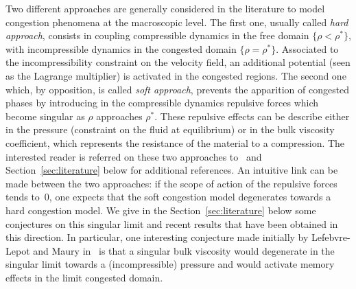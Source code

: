 \documentclass[10pt]{amsart}
\newcommand{\<}{\bigl\langle}
\renewcommand{\>}{\bigr\rangle}
\theoremstyle{definition}
\theoremstyle{remark}
\begin{document}
Two different approaches are generally considered in the literature to model congestion phenomena at the macroscopic level.
The first one, usually called \emph{hard approach}, consists in coupling compressible dynamics in the free domain $\{\rho < \rho^*\}$, with incompressible dynamics in the congested domain $\{\rho = \rho^*\}$.
Associated to the incompressibility constraint on the velocity field, an additional potential (seen as the Lagrange multiplier) is activated in the congested regions.
The second one which, by opposition, is called \emph{soft approach}, prevents the apparition of congested phases by introducing in the compressible dynamics repulsive forces which become singular as $\rho$ approaches $\rho^*$.
These repulsive effects can be describe either in the pressure (constraint on the fluid at equilibrium) or in the bulk viscosity coefficient, which represents the resistance of the material to a compression.
The interested reader is referred on these two approaches to~\cite{maury2012} and Section~\ref{sec:literature} below for additional references.
An intuitive link can be made between the two approaches: if the scope of action of the repulsive forces tends to~$0$, one expects that the soft congestion model degenerates towards a hard congestion model.
We give in the Section~\ref{sec:literature} below some conjectures on this singular limit and recent results that have been obtained in this direction.
In particular, one interesting conjecture made initially by {Lefebvre-Lepot} and {Maury} in~\cite{lefebvre2011} is that a singular bulk viscosity would degenerate in the singular limit towards a (incompressible) pressure and would activate memory effects in the limit congested domain.
\end{document}
